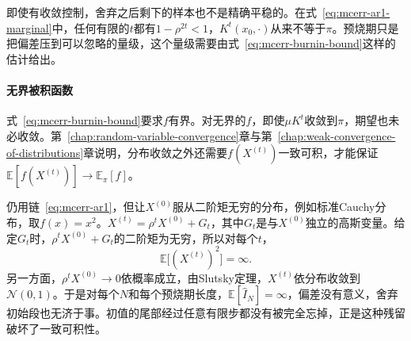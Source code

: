 即使有收敛控制，舍弃之后剩下的样本也不是精确平稳的。在式~\eqref{eq:mcerr-ar1-marginal}中，任何有限的$t$都有$1-\rho^{2t}<1$，$K^{t}(x_0,\cdot)$从来不等于$\pi$。预烧期只是把偏差压到可以忽略的量级，这个量级需要由式~\eqref{eq:mcerr-burnin-bound}这样的估计给出。

\paragraph{无界被积函数}
式~\eqref{eq:mcerr-burnin-bound}要求$f$有界。对无界的$f$，即使$\mu K^{t}$收敛到$\pi$，期望也未必收敛。第~\ref{chap:random-variable-convergence}章与第~\ref{chap:weak-convergence-of-distributions}章说明，分布收敛之外还需要$f(X^{(t)})$一致可积，才能保证$\mathbb{E}[f(X^{(t)})]\to\mathbb{E}_{\pi}[f]$。

仍用链~\eqref{eq:mcerr-ar1}，但让$X^{(0)}$服从二阶矩无穷的分布，例如标准Cauchy分布，取$f(x)=x^{2}$。$X^{(t)}=\rho^{t}X^{(0)}+G_t$，其中$G_t$是与$X^{(0)}$独立的高斯变量。给定$G_t$时，$\rho^{t}X^{(0)}+G_t$的二阶矩为无穷，所以对每个$t$，
\[
 \mathbb{E}\bigl[(X^{(t)})^{2}\bigr]=\infty .
\]
另一方面，$\rho^{t}X^{(0)}\to0$依概率成立，由Slutsky定理，$X^{(t)}$依分布收敛到$\mathcal{N}(0,1)$。于是对每个$N$和每个预烧期长度，$\mathbb{E}[\hat{I}_N]=\infty$，偏差没有意义，舍弃初始段也无济于事。初值的尾部经过任意有限步都没有被完全忘掉，正是这种残留破坏了一致可积性。
